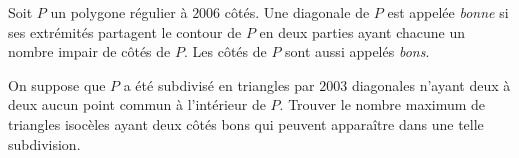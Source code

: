 Soit $P$ un polygone régulier à $2006$ côtés. Une diagonale de $P$ est appelée \emph{bonne} si ses extrémités
partagent le contour de $P$ en deux parties ayant chacune un nombre impair de côtés de $P$. Les côtés de $P$
sont aussi appelés \emph{bons}.

On suppose que $P$ a été subdivisé en triangles par $2003$ diagonales n'ayant deux à deux aucun point commun à
l'intérieur de $P$. Trouver le nombre maximum de triangles isocèles ayant deux côtés bons qui peuvent
apparaître dans une telle subdivision.
